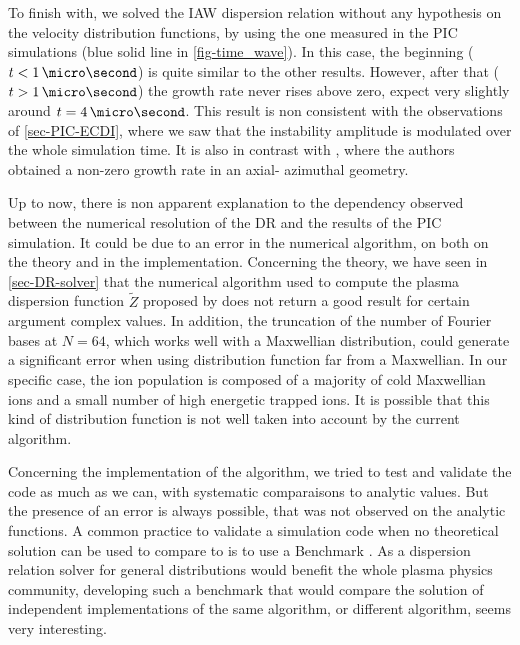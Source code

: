   \vspace{1em}
  To finish with, we solved the \ac{IAW} dispersion relation without any hypothesis on the velocity distribution functions, by using the one measured in the PIC simulations (blue solid line in  \cref{fig-time_wave}).
  In this case, the beginning ($t < 1 \,\micro\second$) is quite similar to the other results.
  However, after that ($t > 1 \,\micro\second$) the growth rate never rises above zero, expect very slightly around $t=4\,\micro\second$.
  This result is non consistent with the observations of \cref{sec-PIC-ECDI}, where we saw that the instability amplitude is modulated over the whole simulation time.
  It is also in contrast with \citet{lafleur2018}, where the authors obtained a non-zero growth rate in an axial- azimuthal geometry.
  
  Up to now, there is non apparent explanation to the dependency  observed between the numerical resolution of the \ac{DR} and the results of the \ac{PIC} simulation.
  It could be due to an error in the numerical algorithm, on both on the theory and in the implementation.
  Concerning the theory, we have seen in \cref{sec-DR-solver} that the numerical algorithm used to compute the plasma dispersion function $\tilde{Z}$ proposed by \citet{xie2013} does not return a good result for certain argument complex values.
  In addition, the truncation of the number of Fourier bases at $N=64$, which works well with a Maxwellian distribution, could generate a significant error when using distribution function far from a Maxwellian.
  In our specific case, the ion population is composed of a majority of cold Maxwellian ions and a small number of high energetic trapped ions.
  It is possible that this kind of distribution function is not well taken into account by the current algorithm.
  
  Concerning the implementation of the algorithm, we tried to test and validate the code as much as we can, with systematic comparaisons to analytic values.
  But the presence of an error is always possible, that was not observed on the analytic functions.
  A common practice to validate a simulation code when no theoretical solution can be used to compare to is to use a Benchmark \citep{turner2013}.
  As a dispersion relation solver for general distributions would benefit the whole plasma physics community, developing such a benchmark that would compare the solution of independent implementations of the same algorithm, or different algorithm, seems very interesting.
  
  \FloatBarrier